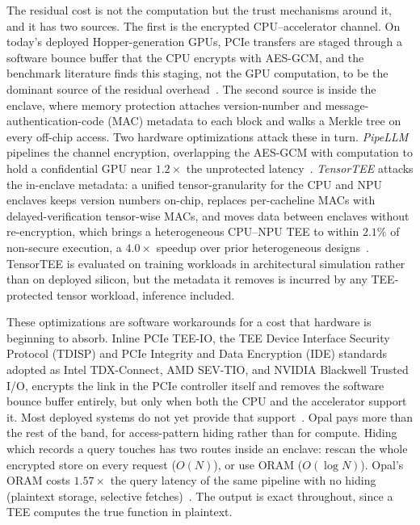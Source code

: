 The residual cost is not the computation but the trust mechanisms around it, and it has two
sources. The first is the encrypted CPU--accelerator channel. On today's deployed
Hopper-generation GPUs, PCIe transfers are staged through a software bounce buffer that the CPU
encrypts with AES-GCM, and the benchmark literature finds this staging, not the GPU computation,
to be the dominant source of the residual overhead~\citep{chrapek_gputee}. The second source is
inside the enclave, where memory protection attaches version-number and
message-authentication-code (MAC) metadata to each block and walks a Merkle tree on every
off-chip access. Two hardware optimizations attack these in turn. \emph{PipeLLM} pipelines the
channel encryption, overlapping the AES-GCM with computation to hold a confidential GPU near
$1.2\times$ the unprotected latency~\citep{pipellm}. \emph{TensorTEE} attacks the in-enclave
metadata: a unified tensor-granularity for the CPU and NPU enclaves keeps version numbers
on-chip, replaces per-cacheline MACs with delayed-verification tensor-wise MACs, and moves data
between enclaves without re-encryption, which brings a heterogeneous CPU--NPU TEE to within
$2.1\%$ of non-secure execution, a $4.0\times$ speedup over prior heterogeneous
designs~\citep{tensortee}. TensorTEE is evaluated on training workloads in architectural
simulation rather than on deployed silicon, but the metadata it removes is incurred by any
TEE-protected tensor workload, inference included.

These optimizations are software workarounds for a cost that hardware is beginning to absorb.
Inline PCIe TEE-IO, the TEE Device Interface Security Protocol (TDISP) and PCIe Integrity and Data
Encryption (IDE) standards adopted as Intel TDX-Connect, AMD SEV-TIO, and
NVIDIA Blackwell Trusted I/O, encrypts the link in the PCIe controller itself and removes the
software bounce buffer entirely, but only when both the CPU and the accelerator support it. Most
deployed systems do not yet provide that support~\citep{nvidia_secureai}. Opal pays more than the rest of
the band, for access-pattern hiding rather than for compute. Hiding which records a query touches
has two routes inside an enclave: rescan the whole encrypted store on every request ($O(N)$), or
use ORAM ($O(\log N)$). Opal's ORAM costs $1.57\times$ the query latency of the same pipeline with
no hiding (plaintext storage, selective fetches)~\citep{kaviani_opal}. The output is exact throughout, since a
TEE computes the true function in plaintext.

